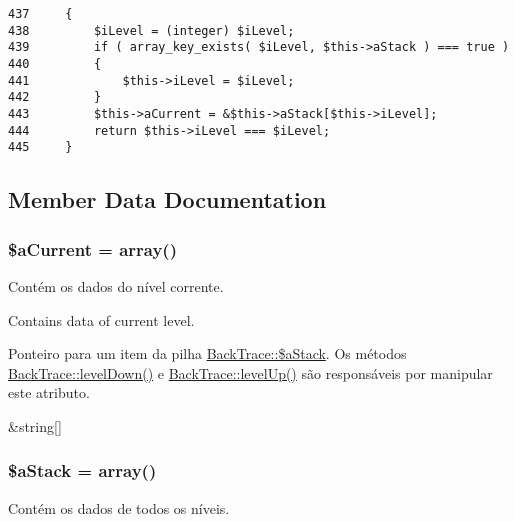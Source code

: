 \begin{Code}\begin{verbatim}437     {
438         $iLevel = (integer) $iLevel;
439         if ( array_key_exists( $iLevel, $this->aStack ) === true )
440         {
441             $this->iLevel = $iLevel;
442         }
443         $this->aCurrent = &$this->aStack[$this->iLevel];
444         return $this->iLevel === $iLevel;
445     }
\end{verbatim}
\end{Code}




\subsection{Member Data Documentation}
\hypertarget{class_back_trace_92d25322fa24d1675b6331dad400ee1f}{
\subsubsection[{\$aCurrent}]{\setlength{\rightskip}{0pt plus 5cm}\$aCurrent = array()}}
\label{class_back_trace_92d25322fa24d1675b6331dad400ee1f}


Contém os dados do nível corrente.

Contains data of current level.

Ponteiro para um item da pilha \hyperlink{class_back_trace_5cb2fde204eda0effb2a17536b7cf962}{BackTrace::\$aStack}. Os métodos \hyperlink{class_back_trace_abf1c1a9c1222e9ff2abb2dc29e7b610}{BackTrace::levelDown()} e \hyperlink{class_back_trace_89e47a095ea0bb56352b6fdf68740eb0}{BackTrace::levelUp()} são responsáveis por manipular este atributo.

\&string\mbox{[}\mbox{]} \hypertarget{class_back_trace_5cb2fde204eda0effb2a17536b7cf962}{
\subsubsection[{\$aStack}]{\setlength{\rightskip}{0pt plus 5cm}\$aStack = array()}}
\label{class_back_trace_5cb2fde204eda0effb2a17536b7cf962}


Contém os dados de todos os níveis.


